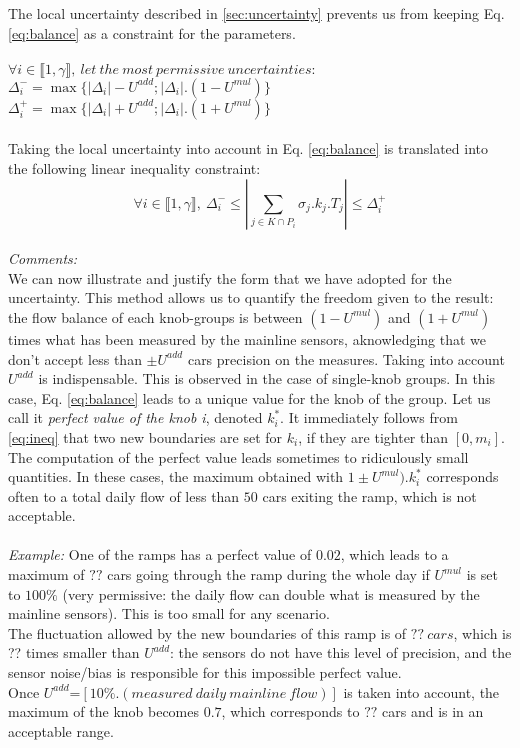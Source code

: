 The local uncertainty described in \ref{sec:uncertainty} prevents us from keeping Eq. \ref{eq:balance} as a constraint for the parameters.\\
\\
$\forall i \in {\llbracket 1,\gamma \rrbracket},\ let\ the\ most\ permissive\ uncertainties:$\\
$\Delta_{i}^{-}=\max{\{|\Delta_{i}|-U^{add};|\Delta_{i}|.(1-U^{mul})\}}$\\
$\Delta_{i}^{+}=\max{\{|\Delta_{i}|+U^{add};|\Delta_{i}|.(1+U^{mul})\}}$\\
\\
Taking the local uncertainty into account in Eq. \ref{eq:balance} is translated into the following linear inequality constraint:
\begin{equation}
\label{eq:ineq}
	\forall i\in \llbracket 1,\gamma \rrbracket,\ \Delta_{i}^{-}\leq |\sum\limits_{j\in K\cap P_{i}}\sigma_{j}.k_{j}.T_{j}| \leq \Delta_{i}^{+}
\end{equation}
\\
\emph{Comments:}\\
We can now illustrate and justify the form that we have adopted for the uncertainty. This method allows us to quantify the freedom given to the result: the flow balance of each knob-groups is between $(1-U^{mul})$ and $(1+U^{mul})$ times what has been measured by the mainline sensors, aknowledging that we don't accept less than $\pm U^{add}$ cars precision on the measures.
Taking into account $U^{add}$ is indispensable. This is observed in the case of single-knob groups. In this case, Eq. \ref{eq:balance} leads to a unique value for the knob of the group. Let us call it \emph{perfect value of the knob i}, denoted $k_{i}^{*}$. It immediately follows from \ref{eq:ineq} that two new boundaries are set for $k_{i}$, if they are tighter than $[0,m_{i}]$.  The computation of the perfect value leads sometimes to ridiculously small quantities. In these cases, the maximum obtained with $1\pm U^{mul}).k_{i}^{*}$ corresponds often to a total daily flow of less than $50$ cars exiting the ramp, which is not acceptable.\\ 
\\
\emph{Example:} One of the ramps has a perfect value of $0.02$, which leads to a maximum of $??$ cars going through the ramp during the whole day if $U^{mul}$ is set to $100\%$ (very permissive: the daily flow can double what is measured by the mainline sensors). This is too small for any scenario.\\ The fluctuation allowed by the new boundaries of this ramp is of $??\ cars$, which is ?? times smaller than $U^{add}$: the sensors do not have this level of precision, and the sensor noise/bias is responsible for this impossible perfect value. \\
Once $U^{add}$=$[10\%.(measured\ daily\ mainline\ flow)]$ is taken into account, the maximum of the knob becomes $0.7$, which corresponds to $??$ cars and is in an acceptable range.\\
